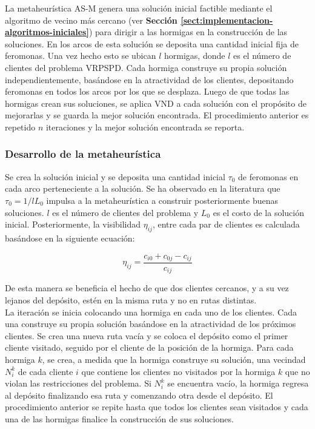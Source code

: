 La metaheurística AS-M genera una solución inicial factible mediante el algoritmo de vecino más cercano (ver \textbf{Sección \ref{sect:implementacion-algoritmos-iniciales}}) para dirigir a las hormigas en la construcción de las soluciones. En los arcos de esta solución  se deposita una cantidad inicial fija de feromonas.
Una vez hecho esto se ubican $l$ hormigas, donde $l$ es el número de clientes del problema VRPSPD. Cada hormiga construye su propia solución independientemente, basándose en la atractividad de los clientes, depositando feromonas en todos los arcos por los que se desplaza. Luego de que todas las hormigas crean sus soluciones, se aplica VND a cada solución con el propósito de mejorarlas y se guarda la mejor solución encontrada. El procedimiento anterior es repetido $n$ iteraciones y la mejor solución encontrada se reporta.

\subsubsection*{Desarrollo de la metaheurística}

Se crea la solución inicial y se deposita una cantidad inicial $\tau_0$ de feromonas en cada arco perteneciente a la solución. Se ha observado en la literatura \cite{aco-pheromone} que $\tau_0 = 1/lL_0$ impulsa a la metaheurística a construir posteriormente buenas soluciones. $l$ es el número de clientes del problema y $L_0$ es el costo de la solución inicial. Posteriormente, la visibilidad $\eta_{ij}$, entre cada par de clientes es calculada basándose en la siguiente ecuación:

\begin{equation}
\eta_{ij} = \frac{c_{i0} + c_{0j} - c_{ij}}{c_{ij}}
\end{equation}

De esta manera se beneficia el hecho de que dos clientes cercanos, y a su vez lejanos del depósito, estén en la misma ruta y no en rutas distintas.\\

La iteración se inicia colocando una hormiga en cada uno de los clientes. Cada una construye su propia solución basándose en la atractividad de los próximos clientes. Se crea una nueva ruta vacía y se coloca el depósito como el primer cliente visitado, seguido por el cliente de la posición de la hormiga. Para cada hormiga $k$, se crea, a medida que la hormiga construye su solución, una vecindad $N_i^k$ de cada cliente $i$ que contiene los clientes no visitados por la hormiga $k$ que no violan las restricciones del problema. Si $N_i^k$ se encuentra vacío, la hormiga regresa al depósito finalizando esa ruta y comenzando otra desde el depósito. El procedimiento anterior se repite hasta que todos los clientes sean visitados y cada una de las hormigas finalice la construcción de sus soluciones.

